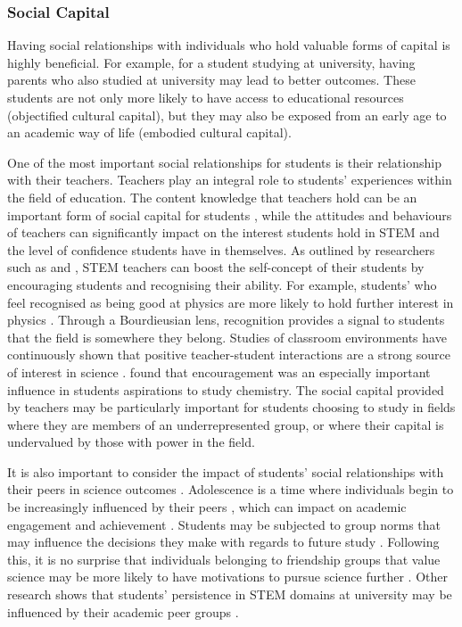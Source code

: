 \subsubsection*{Social Capital}
Having social relationships with individuals who hold valuable forms of capital is highly beneficial. For example, for a student studying at university, having parents who also studied at university may lead to better outcomes. These students are not only more likely to have access to educational resources (objectified cultural capital), but they may also be exposed from an early age to an academic way of life (embodied cultural capital).

One of the most important social relationships for students is their relationship with their teachers. Teachers play an integral role to students' experiences within the field of education. The content knowledge that teachers hold can be an important form of social capital for students \cite{goldhaber2000does,wayne2003teacher,keller2017impact}, while the attitudes and behaviours of teachers can significantly impact on the interest students hold in STEM \cite{keller2017impact} and the level of confidence students have in themselves. As outlined by researchers such as \cite{bandura1986explanatory} and \cite{siegle2007increasing}, STEM teachers can boost the self-concept of their students by encouraging students and recognising their ability. For example, students' who feel recognised as being good at physics are more likely to hold further interest in physics \cite{Hazari2017}. Through a Bourdieusian lens, recognition provides a signal to students that the field is somewhere they belong. Studies of classroom environments have continuously shown that positive teacher-student interactions are a strong source of interest in science \cite{osborne2003attitudes, keller2017impact}. \cite{mujtaba2018students} found that encouragement was an especially important influence in students aspirations to study chemistry. The social capital provided by teachers may be particularly important for students choosing to study in fields where they are members of an underrepresented group, or where their capital is undervalued by those with power in the field.

It is also important to consider the impact of students' social relationships with their peers in science outcomes \cite{osborne2003attitudes}. Adolescence is a time where individuals begin to be increasingly influenced by their peers \cite{douvan1966adolescent}, which can impact on academic engagement and achievement \cite{ryan2000peer}. Students may be subjected to group norms that may influence the decisions they make with regards to future study \cite{brown1986perceptions}. Following this, it is no surprise that individuals belonging to friendship groups that value science may be more likely to have motivations to pursue science further \cite{robnett2013friendship}. Other research shows that students' persistence in STEM domains at university may be influenced by their academic peer groups \cite{Ost_2010}.

